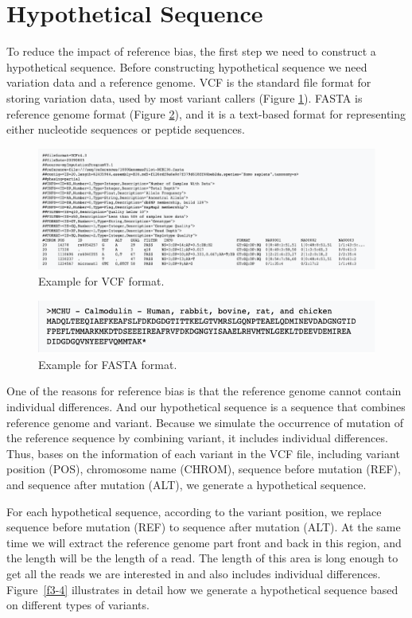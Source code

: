 \section{Hypothetical Sequence}
To reduce the impact of reference bias, the first step we need to construct a hypothetical sequence. Before constructing hypothetical sequence we need variation data and a reference genome. VCF is the standard file format for storing variation data, used by most variant callers (Figure \ref{f3-2}). FASTA is reference genome format (Figure \ref{f3-3}), and it is a text-based format for representing either nucleotide sequences or peptide sequences.

\begin{figure}[H]
\includegraphics[width=1\columnwidth]{body/image/3-2.png}
\caption[VCF format]{Example for VCF format.}
\label{f3-2}
\end{figure}

\begin{figure}[H]
\includegraphics[width=1\columnwidth]{body/image/3-3.png}
\caption[FASTA format]{Example for FASTA format.}
\label{f3-3}
\end{figure}

One of the reasons for reference bias is that the reference genome cannot contain individual differences. And our hypothetical sequence is a sequence that combines reference genome and variant. Because we simulate the occurrence of mutation of the reference sequence by combining variant, it includes individual differences. Thus, bases on the information of each variant in the VCF file, including variant position (POS), chromosome name (CHROM), sequence before mutation (REF), and sequence after mutation (ALT), we generate a hypothetical sequence. 

For each hypothetical sequence, according to the variant position, we replace sequence before mutation (REF) to sequence after mutation (ALT). At the same time we will extract the reference genome part front and back in this region, and the length will be the length of a read. The length of this area is long enough to get all the reads we are interested in and also includes individual differences. Figure~\ref{f3-4} illustrates in detail how we generate a hypothetical sequence based on different types of variants.

